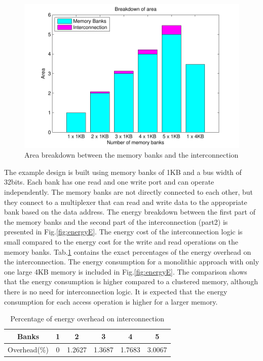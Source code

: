  \begin{figure}
 \centering
 \includegraphics[width = \textwidth]{E/area.pdf}
  \caption{Area breakdown between the memory banks and the interconnection}
 \label{fig:areaE}
 \end{figure}

The example design is built using memory banks of 1KB and a bus width of 32bits.
Each bank has one read and one write port and can operate independently.
The memory banks are not directly connected to each other, but they connect to a multiplexer that can read and write data to the appropriate bank based on the data address. 
The energy breakdown between the first part of the memory banks and the second part of the interconnection (part2) is presented in Fig.\ref{fig:energyE}.
The energy cost of the interconnection logic is small compared to the energy cost for the write and read operations on the memory banks.
Tab.\ref{tab:overhead} contains the exact percentages of the energy overhead on the interconnection. 
The energy consumption for a monolithic approach with only one large 4KB memory is included in Fig.\ref{fig:energyE}.
The comparison shows that the energy consumption is higher compared to a clustered memory, although there is no need for interconnection logic.
It is expected that the energy consumption for each access operation is higher for a larger memory.
 
 \begin{table}[t!]
\caption{Percentage of energy overhead on interconnection}
\label{tab:overhead}
\centering
\begin{tabular}{|c|c|c|c|c|c|}
\hline 
Banks & 1 & 2 & 3 & 4 & 5 \\
\hline 
Overhead(\%) & 0	&	1.2627 & 1.3687 & 1.7683 & 3.0067 \\ 
 \hline 
 \end{tabular} 
\end{table} 
 
